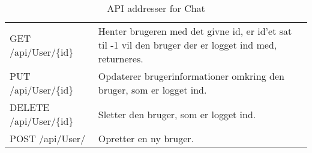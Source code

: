 \begin{table}[H]
	\centering
	\caption{API addresser for Chat}
	\label{tab:web_user}
	\begin{tabular}{|L{0.3\textwidth}|L{0.70\textwidth}|}
		\hline
		\\
		\hline
		GET \newline
		/api/User/\{id\} &
		Henter brugeren med det givne id, er id'et sat til -1 vil den bruger der er logget ind med, returneres. \\
		\hline
		PUT \newline
		/api/User/\{id\} &
		Opdaterer brugerinformationer omkring den bruger, som er logget ind. \\
		\hline
		DELETE \newline
		/api/User/\{id\} &
		Sletter den bruger, som er logget ind. \\
		\hline
		POST \newline
		/api/User/ &
		Opretter en ny bruger. \\
		\hline
	
	\end{tabular}
\end{table}
